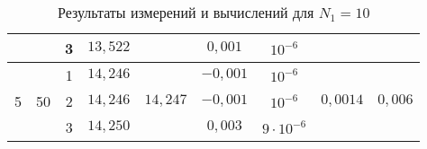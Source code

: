 \begin{table}[h!]
\begin{center}
\begin{tabular}{|c|c|c|c|c|c|c|c|c|}
		\cline{3-4}\cline{6-7}
		& & 3 & $13{,}522$ & & $0{,}001$ & $10^{-6}$ & & \\
		\hline
		\multirow{3}{*}{5} & \multirow{3}{*}{50} & 1 & $14{,}246$ & \multirow{3}{*}{$14{,}247$} & $-0{,}001$ & $10^{-6}$ & \multirow{3}{*}{$0{,}0014$} & \multirow{3}{*}{$0{,}006$} \\
		\cline{3-4}\cline{6-7}
		& & 2 & $14{,}246$ & & $-0{,}001$ & $10^{-6}$ & & \\
		\cline{3-4}\cline{6-7}
		& & 3 & $14{,}250$ & & $0{,}003$ & $9\cdot10^{-6}$ & & \\
		\hline
	\end{tabular}
	\caption{Результаты измерений и вычислений для $N_1=10$}\label{TbOne}
	\end{center}
\end{table}


